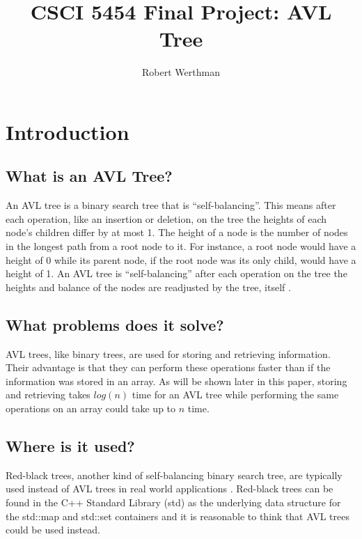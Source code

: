 \documentclass[12pt]{article}
\title{CSCI 5454 Final Project: AVL Tree}
\author{Robert Werthman}
\date{}
\begin{document}
\maketitle

\newpage
\tableofcontents

\newpage
{}
\section*{Introduction}

\subsection*{What is an AVL Tree?}

An AVL tree is a binary search tree that is ``self-balancing''.  This means
after each operation, like an insertion or deletion, on the tree the heights of 
each node's children differ by at most 1.  The height of a node is the number of
nodes in the longest path from a root node to it.  For instance, a root node
would have a height of 0 while its parent node, if the root node was its only child, would
have a height of 1.  An AVL tree is ``self-balancing'' after each operation on
the tree the heights and balance of the nodes are readjusted by the tree,
itself \cite{wiki:avl}.

\subsection*{What problems does it solve?}
AVL trees, like binary trees, are used for storing and retrieving
information.  Their advantage is that they can perform these operations faster
than if the information was stored in an array.  As will be shown later in this
paper, storing and retrieving takes $log(n)$ time for an AVL tree
while performing the same operations on an array could take up to $n$ time.

\subsection*{Where is it used?}
Red-black trees, another kind of self-balancing binary search tree, are
typically used instead of AVL trees in real world applications
\cite{wiki:red-black}.
Red-black trees can be found in the C++ Standard Library (std) as the underlying data structure
for the std::map and std::set containers and it is reasonable to think that AVL
trees could be used instead.
\end{document}
